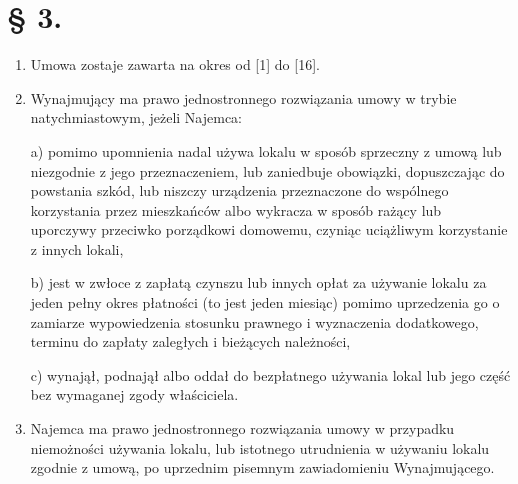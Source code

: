 \documentclass[a4paper,11pt, notitlepage]{article}
\begin{document}
\section*{§ 3.}
    \begin{enumerate}
     \item Umowa zostaje zawarta na okres od [1] do [16].
 	
     \item Wynajmujący ma prawo jednostronnego rozwiązania umowy w trybie natychmiastowym, jeżeli Najemca:
 	
        \subitem a) pomimo upomnienia nadal używa lokalu w sposób sprzeczny z umową lub niezgodnie z jego przeznaczeniem, lub zaniedbuje obowiązki, dopuszczając do powstania szkód, lub niszczy urządzenia	przeznaczone do wspólnego korzystania przez mieszkańców albo wykracza w sposób rażący lub uporczywy przeciwko porządkowi domowemu, czyniąc uciążliwym korzystanie z innych lokali, 
 		
        \subitem b) jest w zwłoce z zapłatą czynszu lub innych opłat za używanie lokalu za jeden pełny okres płatności (to jest jeden miesiąc) 	pomimo uprzedzenia go o zamiarze wypowiedzenia stosunku prawnego i wyznaczenia dodatkowego, terminu do zapłaty zaległych i bieżących należności, 		
 		
        \subitem c) wynajął, podnajął albo oddał do bezpłatnego używania lokal lub jego część bez wymaganej zgody właściciela.
 	
        \item Najemca ma prawo jednostronnego rozwiązania umowy w przypadku niemożności używania lokalu, lub istotnego utrudnienia w używaniu lokalu zgodnie z umową, po uprzednim pisemnym zawiadomieniu Wynajmującego.
    \end{enumerate}
\end{document}
